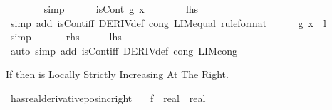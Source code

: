 \begin{isabellebody}
\ \ \ \ \ \ \isamarkupfalse%
\ simp\isanewline
\ \ \ \ \isamarkupfalse%
\ {\isachardoublequoteopen}isCont\ {\isacharquery}{\kern0pt}g\ x{\isachardoublequoteclose}\isanewline
\ \ \ \ \ \ \isamarkupfalse%
\ {\isacartoucheopen}{\isacharquery}{\kern0pt}lhs{\isacartoucheclose}\ \isamarkupfalse%
\ {\isacharparenleft}{\kern0pt}simp\ add{\isacharcolon}{\kern0pt}\ isCont{\isacharunderscore}{\kern0pt}iff\ DERIV{\isacharunderscore}{\kern0pt}def\ cong{\isacharcolon}{\kern0pt}\ LIM{\isacharunderscore}{\kern0pt}equal\ {\isacharbrackleft}{\kern0pt}rule{\isacharunderscore}{\kern0pt}format{\isacharbrackright}{\kern0pt}{\isacharparenright}{\kern0pt}\isanewline
\ \ \ \ \isamarkupfalse%
\ {\isachardoublequoteopen}{\isacharquery}{\kern0pt}g\ x\ {\isacharequal}{\kern0pt}\ l{\isachardoublequoteclose}\isanewline
\ \ \ \ \ \ \isamarkupfalse%
\ simp\isanewline
\ \ \isamarkupfalse%
\isanewline
{}\isamarkupfalse%
\isanewline
\ \ \isamarkupfalse%
\ {\isacharquery}{\kern0pt}rhs\isanewline
\ \ \isamarkupfalse%
\ \isamarkupfalse%
\ {\isacharquery}{\kern0pt}lhs\isanewline
\ \ \ \ \isamarkupfalse%
\ {\isacharparenleft}{\kern0pt}auto\ simp\ add{\isacharcolon}{\kern0pt}\ isCont{\isacharunderscore}{\kern0pt}iff\ DERIV{\isacharunderscore}{\kern0pt}def\ cong{\isacharcolon}{\kern0pt}\ LIM{\isacharunderscore}{\kern0pt}cong{\isacharparenright}{\kern0pt}\isanewline
{}\isamarkupfalse%
%
\endisatagproof
{\isafoldproof}%
%
\isadelimproof
%
\endisadelimproof
%
\isadelimdocument
%
\endisadelimdocument
%
\isatagdocument
%
\isamarkuptrue%
%
\endisatagdocument
{\isafolddocument}%
%
\isadelimdocument
%
\endisadelimdocument
%
\begin{isamarkuptext}%
If  then  is Locally Strictly Increasing At The Right.%
\end{isamarkuptext}\isamarkuptrue%
\isamarkupfalse%
\ has{\isacharunderscore}{\kern0pt}real{\isacharunderscore}{\kern0pt}derivative{\isacharunderscore}{\kern0pt}pos{\isacharunderscore}{\kern0pt}inc{\isacharunderscore}{\kern0pt}right{\isacharcolon}{\kern0pt}\isanewline
\ \ \ f\ {\isacharcolon}{\kern0pt}{\isacharcolon}{\kern0pt}\ {\isachardoublequoteopen}real\ {\isasymRightarrow}\ real{\isachardoublequoteclose}\isanewline

\end{isabellebody}
